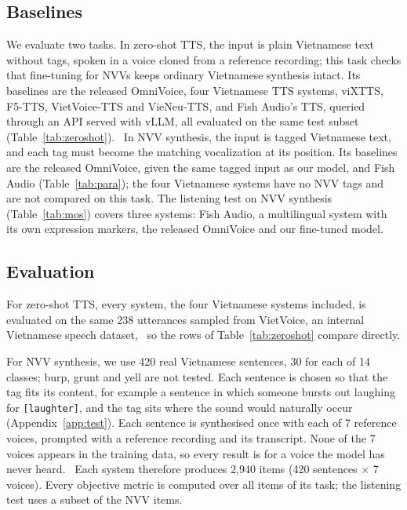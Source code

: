 \documentclass{article} %
\begin{document}
\subsection{Baselines}
We evaluate two tasks. In zero-shot TTS, the input is plain Vietnamese text without tags, spoken
in a voice cloned from a reference recording; this task checks that fine-tuning for NVVs keeps
ordinary Vietnamese synthesis intact. Its baselines are the released OmniVoice, four
Vietnamese TTS systems, viXTTS, F5-TTS, VietVoice-TTS and VieNeu-TTS, and Fish Audio's TTS,
queried through an API served with vLLM, all evaluated on the same test subset (Table~\ref{tab:zeroshot}).%
\ In NVV synthesis, the input is tagged Vietnamese text, and each tag must become the matching
vocalization at its position. Its baselines are the released OmniVoice, given the same tagged
input as our model, and Fish Audio (Table~\ref{tab:para}); the four
Vietnamese systems have no NVV tags and are not compared on this task. The listening test on NVV synthesis (Table~\ref{tab:mos}) covers
three systems: Fish Audio, a multilingual system with its own expression markers, the released OmniVoice and our fine-tuned model.%

\subsection{Evaluation}\label{sec:eval}
For zero-shot TTS, every system, the four Vietnamese systems included, is evaluated on the same
238 utterances sampled from VietVoice, an internal Vietnamese speech dataset,%
\ so the rows of Table~\ref{tab:zeroshot} compare directly.

For NVV synthesis, we use 420 real Vietnamese sentences, 30 for each of 14 classes; burp, grunt
and yell are not tested. Each sentence is chosen so that the tag fits its content, for example
a sentence in which someone bursts out laughing for \texttt{[laughter]}, and the tag sits where
the sound would naturally occur (Appendix~\ref{app:test}). Each sentence is synthesised once with
each of 7 reference voices, prompted with a reference recording and its transcript. None of the
7 voices appears in the training data, so every result is for a voice the model has never
heard.%
\ Each system therefore produces 2,940 items (420 sentences $\times$ 7 voices). Every objective
metric is computed over all items of its task; the listening test uses a subset of the NVV
items.
\end{document}
